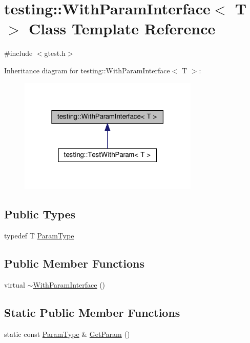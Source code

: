 \hypertarget{classtesting_1_1WithParamInterface}{}\section{testing\+:\+:With\+Param\+Interface$<$ T $>$ Class Template Reference}
\label{classtesting_1_1WithParamInterface}


{\ttfamily \#include $<$gtest.\+h$>$}



Inheritance diagram for testing\+:\+:With\+Param\+Interface$<$ T $>$\+:\nopagebreak
\begin{figure}[H]
\begin{center}
\leavevmode
\includegraphics[width=243pt]{classtesting_1_1WithParamInterface__inherit__graph}
\end{center}
\end{figure}
\subsection*{Public Types}
\begin{DoxyCompactItemize}
\item 
typedef T \hyperlink{classtesting_1_1WithParamInterface_a343febaaebf1f025bda484f841d4fec1}{Param\+Type}
\end{DoxyCompactItemize}
\subsection*{Public Member Functions}
\begin{DoxyCompactItemize}
\item 
virtual \hyperlink{classtesting_1_1WithParamInterface_a4e170bd42fa5e8ce48b80cee6bb52e26}{$\sim$\+With\+Param\+Interface} ()
\end{DoxyCompactItemize}
\subsection*{Static Public Member Functions}
\begin{DoxyCompactItemize}
\item 
static const \hyperlink{classtesting_1_1WithParamInterface_a343febaaebf1f025bda484f841d4fec1}{Param\+Type} \& \hyperlink{classtesting_1_1WithParamInterface_a1078d4493d7aa4d3e50d1d6c661bee4d}{Get\+Param} ()
\end{DoxyCompactItemize}
